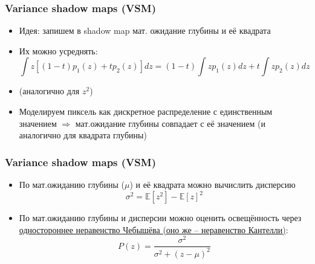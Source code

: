 \documentclass[10pt]{beamer}
\begin{document}
\begin{frame}[fragile]
\frametitle{Variance shadow maps (VSM)}
\begin{itemize}
\item Идея: запишем в shadow map мат. ожидание глубины и её квадрата
\pause
\item Их можно усреднять:
\begin{equation}
\int z \left[(1-t)p_1(z) + tp_2(z)\right] dz = (1-t)\int z p_1(z) dz + t\int z p_2(z) dz
\end{equation}
\item (аналогично для \begin{math}z^2\end{math})
\pause
\item Моделируем пиксель как дискретное распределение с единственным значением \begin{math}\Rightarrow\end{math} мат.ожидание глубины совпадает с её значением (и аналогично для квадрата глубины)
\end{itemize}
\end{frame}

\begin{frame}[fragile]
\frametitle{Variance shadow maps (VSM)}
\begin{itemize}
\item По мат.ожиданию глубины (\begin{math}\mu\end{math}) и её квадрата можно вычислить дисперсию
\begin{equation}
\sigma^2 = \mathbb{E}[z^2] - \mathbb{E}[z]^2
\end{equation}
\pause
\item По мат.ожиданию глубины и дисперсии можно оценить освещённость через \href{https://en.wikipedia.org/wiki/Cantelli%27s_inequality}{одностороннее неравенство Чебышёва (оно же -- неравенство Кантелли)}:
\begin{equation}
P(z) = \frac{\sigma^2}{\sigma^2 + (z - \mu)^2}
\end{equation}
\end{itemize}
\end{frame}
\end{document}
